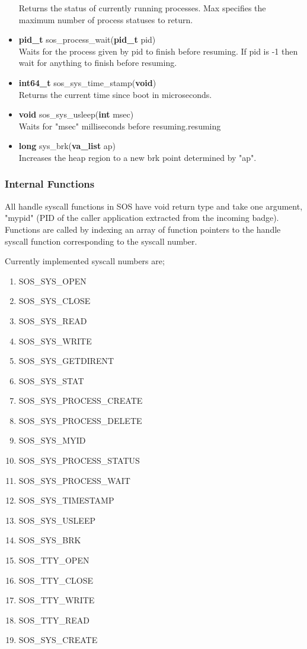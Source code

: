 \documentclass[12pt]{article}
\begin{document}
\begin{itemize}
Returns the status of currently running processes. Max specifies the maximum number of process statuses to return.
\item \textbf{pid\_t} sos\_process\_wait(\textbf{pid\_t} pid)\\
Waits for the process given by pid to finish before resuming. If pid is -1 then wait for anything to finish before resuming.
\item \textbf{int64\_t} sos\_sys\_time\_stamp(\textbf{void})\\
Returns the current time since boot in microseconds.
\item \textbf{void} sos\_sys\_usleep(\textbf{int} msec)\\
Waits for "msec" milliseconds before resuming.resuming
\item \textbf{long} sys\_brk(\textbf{va\_list} ap)\\
Increases the heap region to a new brk point determined by "ap".
\end{itemize}
\subsubsection{Internal Functions}
All handle syscall functions in SOS have void return type and take one argument, "mypid" (PID of the caller application extracted from the incoming badge). Functions are called by indexing an array of function pointers to the handle syscall function corresponding to the syscall number.

Currently implemented syscall numbers are;
\begin{enumerate}
\item SOS\_SYS\_OPEN
\item SOS\_SYS\_CLOSE
\item SOS\_SYS\_READ
\item SOS\_SYS\_WRITE
\item SOS\_SYS\_GETDIRENT
\item SOS\_SYS\_STAT
\item SOS\_SYS\_PROCESS\_CREATE
\item SOS\_SYS\_PROCESS\_DELETE
\item SOS\_SYS\_MYID
\item SOS\_SYS\_PROCESS\_STATUS
\item SOS\_SYS\_PROCESS\_WAIT
\item SOS\_SYS\_TIMESTAMP
\item SOS\_SYS\_USLEEP
\item SOS\_SYS\_BRK
\item SOS\_TTY\_OPEN
\item SOS\_TTY\_CLOSE
\item SOS\_TTY\_WRITE
\item SOS\_TTY\_READ
\item SOS\_SYS\_CREATE
\end{enumerate}
\end{document}
